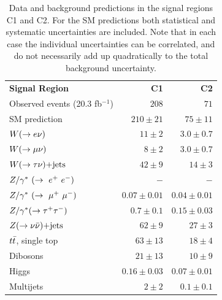 \begin{table}[!ht]
\begin{center}
\begin{small}
\begin{tabular*}{\textwidth}{@{\extracolsep{\fill}}lrr}\hline
{\bf  Signal Region}  & \textbf{C1} & \textbf{C2}  \\
    Observed events  (20.3 fb${}^{-1}$)&  $208$  & $71$  \\ \hline

    SM prediction &  $210 \pm 21$  & $75 \pm 11$ \\ \hline

    $W(\rightarrow e \nu)$        &  $11 \pm 2$ &  $3.0 \pm 0.7$ \\

    $W(\rightarrow \mu \nu)$        &  $8 \pm 2$ &  $3.0 \pm 0.7$  \\

    $W(\rightarrow \tau \nu)\text{+jets}$        &  $42 \pm 9$  & $14 \pm 3$ \\

    $Z/\gamma^*~(\rightarrow~e^+~e^-)$        &  $-$   &  $-$ \\

    $Z/\gamma^*~(\rightarrow~\mu^+~\mu^-)$        &  $0.07 \pm 0.01$  & $0.04 \pm 0.01$  \\

    $Z/\gamma^*(\rightarrow \tau^+ \tau^-)$        &  $0.7 \pm 0.1$    & $0.15 \pm 0.03$ \\

    $Z(\rightarrow \nu \bar{\nu})\text{+jets}$        &  $62 \pm 9$ & $27 \pm 3$  \\

    $t\bar{t}$, single top          &     $63 \pm 13$   &  $18 \pm 4$ \\

    Dibosons      &  $21 \pm 13$  & $10 \pm 9$  \\

    Higgs         &  $0.16 \pm 0.03$  & $0.07 \pm 0.01$  \\

    Multijets     &  $2 \pm 2$  & $0.1 \pm 0.1$  \\ \hline \hline

    \end{tabular*}
    \end{small}

    \end{center}
    \caption[Data and background predictions in the signal regions C1 and C2.]{Data and background predictions in the signal regions C1 and C2.
      For the SM predictions both statistical and systematic uncertainties are included.
        Note that in each case the individual
        uncertainties can be correlated, and do not necessarily add up quadratically to the total background uncertainty.
    }
\label{tab:CharmTaggedSignalRegions}
\end{table}

